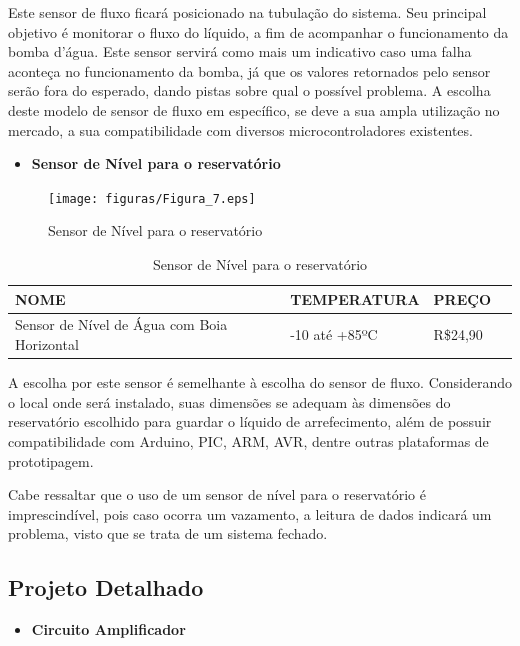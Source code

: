 Este sensor de fluxo ficará posicionado na tubulação do sistema. Seu principal objetivo é monitorar o fluxo do líquido, a fim de acompanhar o funcionamento da bomba d’água. Este sensor servirá como mais um indicativo caso uma falha aconteça no funcionamento da bomba, já que os valores retornados pelo sensor serão fora do esperado, dando pistas sobre qual o possível problema. A escolha deste modelo de sensor de fluxo em específico, se deve a sua ampla utilização no mercado, a sua compatibilidade com diversos microcontroladores existentes.
\newpage
\begin{itemize}
    \item \textbf{Sensor de Nível para o reservatório}
\end{itemize}
\begin{figure}[!h]                  
	\centering                          
	\texttt{[image: figuras/Figura\_7.eps]}
	\caption{ Sensor de Nível para o reservatório}   \label{figsensor5}       
\end{figure}

\begin{table}[!h]
    \centering
    \begin{tabular}{|p{3cm}|p{5cm}|p{3cm}|p{3cm}|}
    \hline
    \textbf{NOME} & \textbf{TEMPERATURA}    & \textbf{PREÇO} \\ \hline
    Sensor de Nível de Água com Boia Horizontal      & -10 até +85ºC &  R\$24,90  \\ \hline
    \end{tabular}
    \caption{Sensor de Nível para o reservatório}
    \end{table}

A escolha por este sensor é semelhante à escolha do sensor de fluxo. Considerando o local onde será instalado, suas dimensões se adequam às dimensões do reservatório escolhido para guardar o líquido de arrefecimento, além de possuir compatibilidade com Arduino, PIC, ARM, AVR, dentre outras plataformas de prototipagem.

Cabe ressaltar que o uso de um sensor de nível para o reservatório é imprescindível, pois caso ocorra um vazamento, a leitura de dados indicará um problema, visto que se trata de um sistema fechado.

\subsection{Projeto Detalhado}

\begin{itemize}
    \item \textbf{Circuito Amplificador}
\end{itemize}

